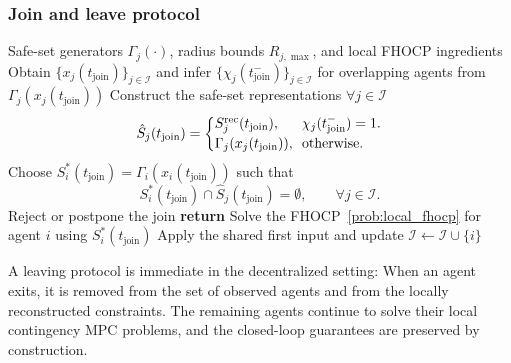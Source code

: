 \documentclass[twocolumn]{autart}
\begin{document}
\subsubsection{Join and leave protocol}
\begin{algorithm}[H]
\caption{\emph{PnP} join protocol}
\label{alg:join_protocol}
\begin{algorithmic}[1]
\Require Safe-set generators \(\Gamma_j(\cdot)\), radius bounds \(R_{j,\max}\), and local FHOCP ingredients
\State Obtain \(\{x_j(t_{\mathrm{join}})\}_{j\in\mathcal I}\) and infer \(\{\chi_j(t_{\mathrm{join}}^-)\}_{j\in\mathcal I}\) for overlapping agents from \(\Gamma_j(x_j(t_{\mathrm{join}}))\)
\State Construct the safe-set representations $\forall j\in\mathcal I$
\[
\hat S_j(t_{\mathrm{join}})
=
\left\{
\begin{array}{@{}ll@{}}
S_j^{\mathrm{rec}}(t_{\mathrm{join}}),
&\!\! \chi_j(t_{\mathrm{join}}^-)=1.\\[0.2em]
\Gamma_j(x_j(t_{\mathrm{join}})),
&\!\! \text{otherwise}.
\end{array}
\right.
\]
\State Choose \(S_i^\ast(t_{\mathrm{join}})=\Gamma_i(x_i(t_{\mathrm{join}}))\) such that
\[
S_i^\ast(t_{\mathrm{join}})\cap \hat S_j(t_{\mathrm{join}})=\emptyset,
\qquad \forall j\in\mathcal I.
\]
    \State Reject or postpone the join
    \State \textbf{return}
\EndIf
\State Solve the FHOCP~\eqref{prob:local_fhocp} for agent \(i\) using \(S_i^\ast(t_{\mathrm{join}})\)
\State Apply the shared first input and update \(\mathcal I\gets \mathcal I\cup\{i\}\)
\end{algorithmic}
\end{algorithm}
A leaving protocol is immediate in the decentralized setting: When an agent exits, it is removed from the set of observed agents and from the locally reconstructed constraints. The remaining agents continue to solve their local contingency MPC problems, and the closed-loop guarantees are preserved by construction.

\end{document}
